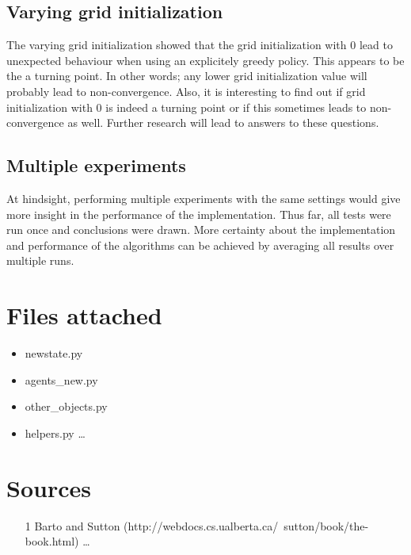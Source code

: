 \documentclass{article}
\begin{document}
\subsection{Varying grid initialization}
The varying grid initialization showed that the grid initialization with 0 lead to unexpected behaviour when using an explicitely greedy policy. This appears to be the a turning point. In other words; any lower grid initialization value will probably lead to non-convergence. Also, it is interesting to find out if grid initialization with 0 is indeed a turning point or if this sometimes leads to non-convergence as well. Further research will lead to answers to these questions. 

\subsection{Multiple experiments}
At hindsight, performing multiple experiments with the same settings would give more insight in the performance of the implementation. Thus far, all tests were run once and conclusions were drawn. More certainty about the implementation and performance of the algorithms can be achieved by averaging all results over multiple runs.
\pagebreak
\section{Files attached}
\begin{itemize}
\item newstate.py
\item agents\_new.py
\item other\_objects.py
\item helpers.py \ldots
\end{itemize}

\section{Sources}



\begin{itemize}
	\item [1] Barto and Sutton (http://webdocs.cs.ualberta.ca/~sutton/book/the-book.html) \ldots
\end{itemize}
\end{document}

